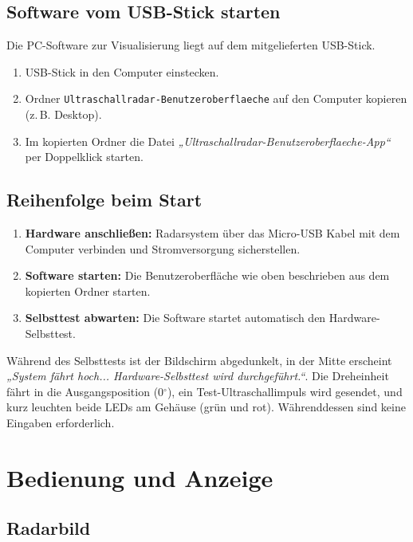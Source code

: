 \documentclass[a4paper,11pt]{article}
\begin{document}
	\subsection{Software vom USB-Stick starten}
	
	Die PC-Software zur Visualisierung liegt auf dem mitgelieferten USB-Stick. 
	
	\begin{enumerate}
		\item USB-Stick in den Computer einstecken.
		\item Ordner \texttt{Ultraschallradar-Benutzeroberflaeche} auf den Computer kopieren (z.\,B. Desktop).
		\item Im kopierten Ordner die Datei \textit{„Ultraschallradar-Benutzeroberflaeche-App“} per Doppelklick starten.
	\end{enumerate}
	
	\subsection{Reihenfolge beim Start}
	
	\begin{enumerate}
		\item \textbf{Hardware anschlie\ss en:} Radarsystem über das Micro-USB Kabel mit dem Computer verbinden und Stromversorgung sicherstellen. 
		\item \textbf{Software starten:} Die Benutzeroberfläche wie oben beschrieben aus dem kopierten Ordner starten. 
		\item \textbf{Selbsttest abwarten:} Die Software startet automatisch den Hardware-Selbsttest.
	\end{enumerate}
	
	Während des Selbsttests ist der Bildschirm abgedunkelt, in der Mitte erscheint \textit{„System fährt hoch... Hardware-Selbsttest wird durchgeführt.“}. 
	Die Dreheinheit fährt in die Ausgangsposition (0\(^\circ\)), ein Test-Ultraschallimpuls wird gesendet, und kurz leuchten beide LEDs am Gehäuse (grün und rot). 
	Währenddessen sind keine Eingaben erforderlich.
	\newpage
	
	\section{Bedienung und Anzeige}
	
	\subsection{Radarbild}
	
\end{document}
